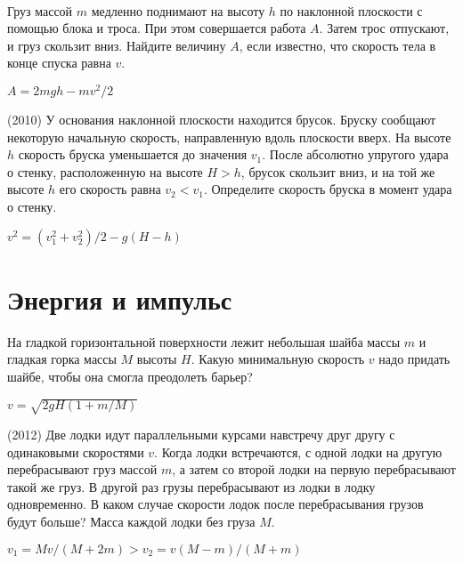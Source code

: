 \begin{ex}
\hspace{0pt} \\
\begin{minipage}{.65\textwidth}
Груз массой $m$ медленно поднимают на высоту $h$ по наклонной плоскости с помощью блока и троса. 
При этом совершается работа $A$. Затем трос отпускают, и груз скользит вниз. Найдите величину $A$, если известно, 
что скорость тела в конце спуска равна $v$.
\end{minipage}
\begin{minipage}{.35\textwidth}
\centering

\end{minipage}
\begin{ans}
$A=2mgh - mv^2/2$
\end{ans}
\end{ex}

\begin{ex}
(2010) У основания наклонной плоскости находится брусок. Бруску сообщают некоторую начальную скорость, 
направленную вдоль плоскости вверх. На высоте $h$ скорость бруска уменьшается до значения $v_1$. 
После абсолютно упругого удара о стенку, расположенную на высоте $H > h$, брусок скользит вниз, 
и на той же высоте $h$ его скорость равна $v_2<v_1$. Определите скорость бруска в момент удара о стенку.
\begin{ans}
$v^2 = (v_1^2 + v_2^2)/2 - g(H-h)$
\end{ans}
\end{ex}

\section{Энергия и импульс}

\begin{ex}
На гладкой горизонтальной поверхности лежит небольшая шайба массы $m$ и гладкая горка массы $M$ высоты $H$. Какую минимальную скорость $v$ надо придать шайбе, чтобы она смогла преодолеть барьер?
\begin{ans}
$v = \sqrt{2gH(1+m/M)}$
\end{ans}
\end{ex}

\begin{ex}
(2012) Две лодки идут параллельными курсами навстречу друг другу с одинаковыми скоростями $v$. Когда лодки встречаются, с одной лодки на другую перебрасывают груз массой $m$, а затем со второй лодки на первую перебрасывают такой же груз. 
В другой раз грузы перебрасывают из лодки в лодку одновременно. В каком случае скорости лодок после перебрасывания грузов будут больше? 
Масса каждой лодки без груза $M$.
\begin{ans}
$v_1 = Mv/(M+2m) > v_2 = v(M-m)/(M+m)$
\end{ans}
\end{ex}

